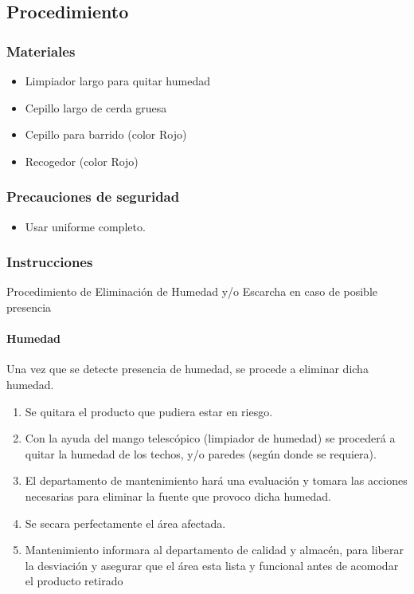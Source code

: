 \subsection{Procedimiento}

\subsubsection{Materiales}

\begin{itemize}
	\item Limpiador largo para quitar humedad
	\item Cepillo largo de cerda gruesa
	\item Cepillo para barrido (color Rojo)
	\item Recogedor (color Rojo)
\end{itemize}

\subsubsection{Precauciones de seguridad}

\begin{itemize}
	\item Usar uniforme completo.
\end{itemize}

\subsubsection{Instrucciones}

Procedimiento de Eliminación de Humedad y/o Escarcha en caso de posible presencia

\paragraph{Humedad}

Una vez que se detecte presencia de humedad, se procede a eliminar dicha humedad.

\begin{enumerate}
	\item Se quitara el producto que pudiera estar en riesgo.
	\item Con la ayuda del mango telescópico (limpiador de humedad) se procederá a quitar la humedad de los techos, y/o paredes (según donde se requiera).
	\item El departamento de mantenimiento hará una evaluación y tomara las acciones necesarias para eliminar la fuente que provoco dicha humedad.
	\item Se secara perfectamente el área afectada.
	\item Mantenimiento informara al departamento de calidad y almacén, para liberar la desviación y asegurar que el área esta lista y funcional antes de acomodar el producto retirado
\end{enumerate}


